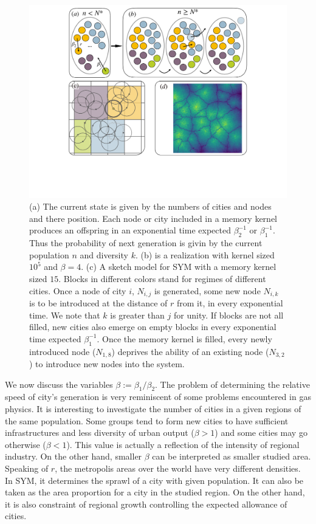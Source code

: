 \documentclass[reprint,unsortedaddress,amsmath,amssymb,aps,prl,showkeys]{revtex4-2}
\begin{document}
\begin{figure}
    \centering
    \includegraphics[width = 0.95\linewidth]{pics/sketchgood.pdf}
    \caption{(a) The current state is given by the numbers of cities and nodes and there position. Each node or city included in a memory kernel produces an offspring in an exponential time expected $\beta_2^{-1}$ or $\beta_1^{-1}$. Thus the probability of next generation is givin by the current population $n$ and diversity $k$. (b) is a realization with kernel sized $10^5$ and $\beta = 4$. (c) A sketch model for SYM with a memory kernel sized $15$. Blocks in different colors stand for regimes of different cities. Once a node of city $i$, $N_{i,j}$ is generated, some new node $N_{i,k}$ is to be introduced at the distance of $r$ from it, in every exponential time. We note that $k$ is greater than $j$ for unity. If blocks are not all filled, new cities also emerge on empty blocks in every exponential time expected $\beta_1^{-1}$. Once the memory kernel is filled, every newly introduced node ($N_{1,8}$) deprives the ability of an existing node ($N_{3,2}$) to introduce new nodes into the system.}
    \label{sketchpic}
\end{figure}

We now discuss the variables $\beta:=\beta_1/\beta_2$. The problem of determining the relative speed of city's generation is very reminiscent of some problems encountered in gas physics. It is interesting to investigate the number of cities in a given regions of the same population. Some groups tend to form new cities to have sufficient infrastructures and less diversity of urban output ($\beta > 1$) and some cities may go otherwise ($\beta< 1$). This value is actually a reflection of the intensity of regional industry. On the other hand, smaller $\beta$ can be interpreted as smaller studied area. Speaking of $r$, the metropolis areas over the world have very different densities. In SYM, it determines the sprawl of a city with given population. It can also be taken as the area proportion for a city in the studied region. On the other hand, it is also constraint of regional growth controlling the expected allowance of cities. %
\end{document}

